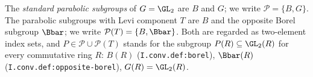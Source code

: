 The \emph{standard parabolic subgroups} of $G=\GL_2$ are $B$ and $G$; we write $\mathcal P=\{B,G\}$. The parabolic subgroups
with Levi component $T$ are $B$ and the opposite Borel subgroup $\Bbar$; we write $\mathcal P(T)=\{B,\Bbar\}$. Both are regarded
as two-element index sets, and $P\in\mathcal P\cup\mathcal P(T)$ stands for the subgroup $P(R)\subseteq\GL_2(R)$ for every commutative
ring $R$: $B(R)$ (\texttt{I.conv.def:borel}), $\Bbar(R)$ (\texttt{I.conv.def:opposite-borel}), $G(R)=\GL_2(R)$.
